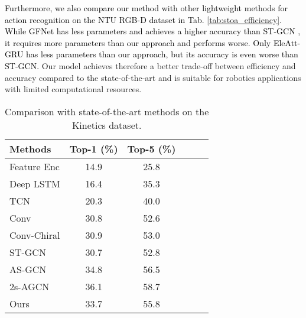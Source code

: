\documentclass[letterpaper, 10 pt, conference]{ieeeconf}
\newcommand{\todo}[1]{{\textcolor{black}{#1}}}
\begin{document}
\todo{
Furthermore, we also compare our method with other lightweight methods for action recognition on the NTU RGB-D dataset in Tab. \ref{tab:stoa_efficiency}. While GFNet \cite{liu2020gfnet} has less parameters and achieves a higher accuracy than ST-GCN \cite{yan2018spatial}, it requires more parameters than our approach and performs worse. Only EleAtt-GRU \cite{zhang2019eleatt} has less parameters than our approach, but its accuracy is even worse than ST-GCN.}
Our model achieves therefore a better trade-off between efficiency and accuracy compared to the state-of-the-art and is suitable for robotics applications with limited computational resources.



\begin{table}[tb]
\centering
\resizebox{0.85\linewidth}{!}
{\begin{tabular}{lccccc}
\hline
Methods     &    Top-1 (\%)   &    Top-5 (\%) \\
\hline
Feature Enc \cite{fernando2015modeling} &     14.9        &     25.8      \\
Deep LSTM \cite{shahroudy2016ntu}   &     16.4        &     35.3      \\
TCN \cite{kim2017interpretable}        &     20.3        &     40.0      \\
Conv \cite{yeh2019chirality} &     30.8        &     52.6      \\
Conv-Chiral \cite{yeh2019chirality} &     30.9        &     53.0      \\
ST-GCN \cite{yan2018spatial}     &     30.7        &     52.8      \\
AS-GCN\cite{li2019actional} & 34.8 & 56.5 \\
2s-AGCN\cite{shi2019two} & 36.1 & 58.7 \\
\hline
Ours        &     33.7   &     55.8      \\
\hline
\end{tabular}}
\caption{Comparison with state-of-the-art methods on the Kinetics dataset.}
\label{tab:stoa_k}
\vspace{-5mm}
\end{table}
\end{document}
